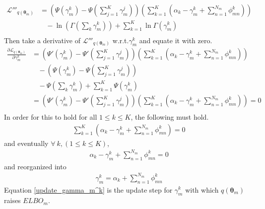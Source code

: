\documentclass[a4]{article}
\begin{document}
\begin{equation}
\begin{aligned}
    \mathcal{L}'''_{q(\bm{\theta}_m)}
    &=
        \left(
            \Psi( \gamma_{m}^k ) - \Psi( \sum_{j=1}^{K} \gamma_{m}^j )
        \right)
        \left(
             \sum_{k=1}^{K}
                 \left( \alpha_k - \gamma_{m}^k 
                 + \sum_{n=1}^{N_m} \phi_{mn}^{k}
                 \right)
        \right)\\
    &\:\:\:\:
      - \ln \left( \Gamma( \sum_k \gamma_{m}^k ) \right) 
      + \sum_{k=1}^{K} \ln \Gamma(\gamma_{m}^k)\\
\end{aligned}
\end{equation}
Then take a derivative of $\mathcal{L}'''_{q(\bm{\theta}_m)}$ w.r.t.$\gamma_{m}^k$ and equate it with zero.
\begin{equation}
\begin{aligned}
    \frac{\partial\mathcal{L}_{q(\bm{\theta}_m)}}{\partial \gamma_{m}^k}
    &=
        \left(
            \Psi'( \gamma_{m}^k ) - \Psi'( \sum_{j=1}^{K} \gamma_{m}^j )
        \right)
        \left(
             \sum_{k=1}^{K}
                 \left( \alpha_k - \gamma_{m}^k 
                 + \sum_{n=1}^{N_m} \phi_{mn}^{k}
                 \right)
        \right)\\
    &\:\:\:\:-
        \left(
            \Psi( \gamma_{m}^k ) - \Psi( \sum_{j=1}^{K} \gamma_{m}^j )
        \right)\\
    &\:\:\:\:
      - \Psi( \sum_k \gamma_{m}^k )
      + \sum_{k=1}^{K} \Psi(\gamma_{m}^k)\\
    &=
        \left(
            \Psi'( \gamma_{m}^k ) - \Psi'( \sum_{j=1}^{K} \gamma_{m}^j )
        \right)
        \left(
             \sum_{k=1}^{K}
                 \left( \alpha_k - \gamma_{m}^k 
                 + \sum_{n=1}^{N_m} \phi_{mn}^{k}
                 \right)
        \right) = 0\\
\end{aligned}
\end{equation}
In order for this to hold for all $1 \le k \le K$, the following must hold.
\begin{equation}
\begin{aligned}
\sum_{k=1}^{K}
\left(
    \alpha_k - \gamma_{m}^k + \sum_{n=1}^{N_m} \phi_{mn}^{k}
\right) = 0
\end{aligned}
\end{equation}
and eventually $\forall \:k, (1 \le k \le K)$,
\begin{equation}
\begin{aligned}
    \alpha_k - \gamma_{m}^k + \sum_{n=1}^{N_m} \phi_{mn}^{k} = 0
\end{aligned}
\end{equation}
and reorganized into
\begin{equation}
\begin{aligned}
    \gamma_{m}^k = \alpha_k + \sum_{n=1}^{N_m} \phi_{mn}^{k}\label{update_gamma_m^k}
\end{aligned}
\end{equation}
Equation \ref{update_gamma_m^k} is the update step for $\gamma_{m}^k$ with which $q(\bm{\theta}_m)$ raises $ELBO_m$.
\end{document}
